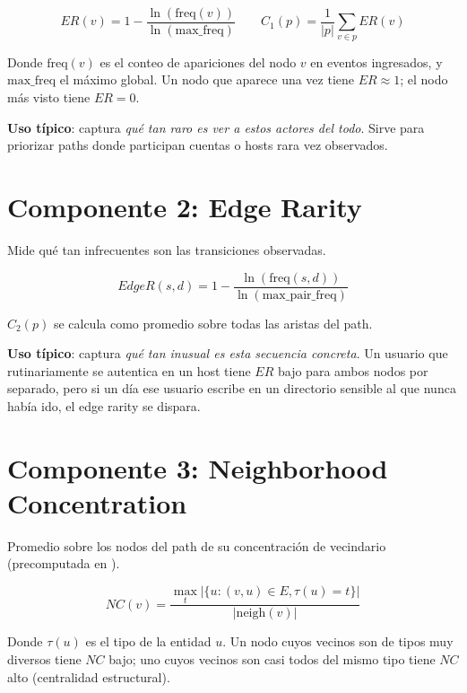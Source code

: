 \begin{equation*}
ER(v) = 1 - \frac{\ln(\text{freq}(v))}{\ln(\text{max\_freq})}
\qquad C_1(p) = \frac{1}{|p|} \sum_{v \in p} ER(v)
\end{equation*}

Donde $\text{freq}(v)$ es el conteo de apariciones del nodo $v$ en
eventos ingresados, y $\text{max\_freq}$ el máximo global. Un nodo
que aparece una vez tiene $ER \approx 1$; el nodo más visto tiene
$ER = 0$.

\textbf{Uso típico}: captura \emph{qué tan raro es ver a estos
actores del todo}. Sirve para priorizar paths donde participan
cuentas o hosts rara vez observados.

\section{Componente 2: Edge Rarity}
\label{sec:scoring-edger}

Mide qué tan infrecuentes son las transiciones observadas.

\begin{equation*}
EdgeR(s, d) = 1 - \frac{\ln(\text{freq}(s, d))}{\ln(\text{max\_pair\_freq})}
\end{equation*}

$C_2(p)$ se calcula como promedio sobre todas las aristas del path.

\textbf{Uso típico}: captura \emph{qué tan inusual es esta secuencia
concreta}. Un usuario que rutinariamente se autentica en un host
tiene $ER$ bajo para ambos nodos por separado, pero si un día ese
usuario escribe en un directorio sensible al que nunca había ido, el
edge rarity se dispara.

\section{Componente 3: Neighborhood Concentration}
\label{sec:scoring-nc}

Promedio sobre los nodos del path de su concentración de vecindario
(precomputada en ).

\begin{equation*}
NC(v) = \frac{\max_t |\{u : (v, u) \in E, \tau(u) = t\}|}{|\text{neigh}(v)|}
\end{equation*}

Donde $\tau(u)$ es el tipo de la entidad $u$. Un nodo cuyos vecinos
son de tipos muy diversos tiene $NC$ bajo; uno cuyos vecinos son
casi todos del mismo tipo tiene $NC$ alto (centralidad estructural).

